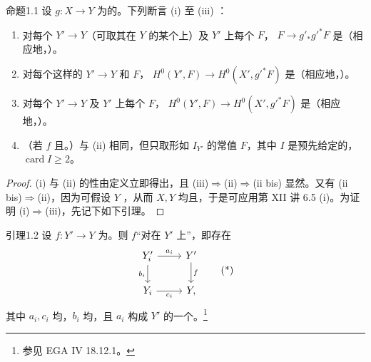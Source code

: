 \begin{SGAresult}{命题}{1.1}
设 $g:X\to Y$ 为的。下列断言 (i) 至 (iii) ：
\begin{enumerate}
\item[(i)] 对每个 $Y'\to Y$（可取其在 $Y$ 的某个上）及 $Y'$ 上每个 $F$， $F\to g'_*g'^*F$ 是（相应地，）。
\item[(ii)] 对每个这样的 $Y'\to Y$ 和 $F$， $H^0(Y',F)\to H^0(X',g'^*F)$ 是（相应地，）。
\item[(iii)] 对每个 $Y'\to Y$ 及 $Y'$ 上每个 $F$， $H^0(Y',F)\to H^0(X',g'^*F)$ 是（相应地，）。
\item[(ii bis)] （若 $f$ 且。）与 (ii) 相同，但只取形如 $I_{Y'}$ 的常值 $F$，其中 $I$ 是预先给定的，$\operatorname{card}I\geq2$。
\end{enumerate}
\end{SGAresult}
\begin{proof}
(i) 与 (ii) 的性由定义立即得出，且 (iii)$\Rightarrow$(ii)$\Rightarrow$(ii bis) 显然。又有 (ii bis)$\Rightarrow$(ii)，因为可假设 $Y$ ，从而 $X,Y$ 均且，于是可应用第 XII 讲 6.5 (i)。为证明 (i)$\Rightarrow$(iii)，先记下如下引理。
\end{proof}
\begin{SGAresult}{引理}{1.2}
设 $f:Y'\to Y$ 为。则 $f$“对在 $Y'$ 上”，即存在
\[
\begin{tikzcd}
Y'_i\arrow[r,"a_i"]\arrow[d,"b_i"']&Y'\arrow[d,"f"]\\
Y_i\arrow[r,"c_i"']&Y,
\end{tikzcd}\tag{*}
\]
其中 $a_i,c_i$ 均，$b_i$ 均，且 $a_i$ 构成 $Y'$ 的一个。\footnote{参见 EGA IV 18.12.1。}
\end{SGAresult}
